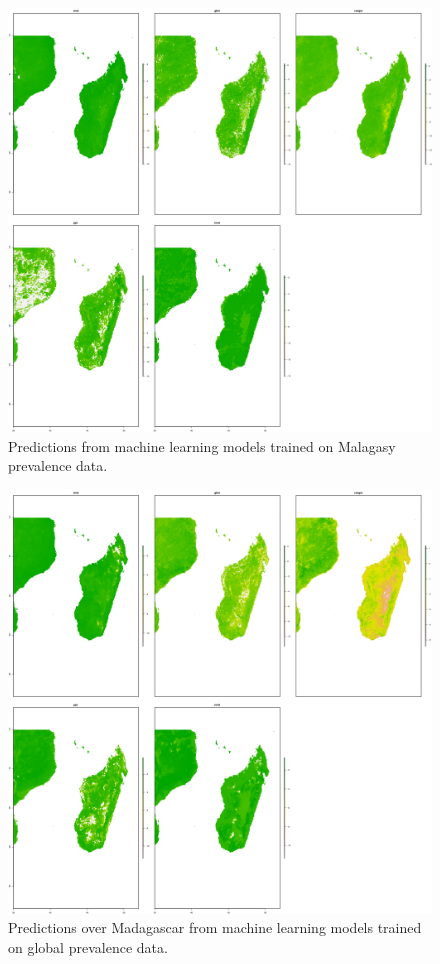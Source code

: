 \documentclass[review]{elsarticle}
\begin{document}
\begin{figure}[h!]
  \centering
  \includegraphics[width=1\textwidth]{figs/SI/MDG_all_ml.png}
\caption{
  Predictions from machine learning models trained on Malagasy prevalence data.
}

\end{figure}


\begin{figure}[h!]
  \centering
  \includegraphics[width=1\textwidth]{figs/SI/MDG_all_globalml.png}
\caption{
  Predictions over Madagascar from machine learning models trained on global prevalence data.
}

\end{figure}
\end{document}
